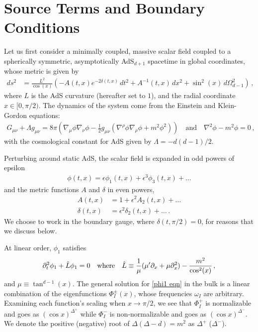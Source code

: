 \documentclass[../PhD.tex]{subfiles}
\begin{document}

\section{Source Terms and Boundary Conditions}
\label{sec: source terms and BCs}

Let us first consider a minimally coupled, massive scalar field coupled to a spherically symmetric, asymptotically AdS$_{d+1}$ spacetime in global coordinates, whose metric is given by
\begin{align}
\label{AdS metric}
ds^2 &= \frac{L^2}{\cos(x)} \left( - A(t,x) e^{-2 \delta(t,x)} \, dt^2 + A^{-1}(t, x) \, dx^2 + \sin^2 (x) \, d\Omega^2_{d-1} \right) \, ,
\end{align}
where $L$ is the AdS curvature (hereafter set to $1$), and the radial coordinate $x \in [0, \pi/2)$. The dynamics of the system come from the Einstein and Klein-Gordon equations:
\begin{align}
G_{\mu \nu} + \Lambda g_{\mu \nu} = 8 \pi \left( \nabla_\mu \phi \nabla_\nu \phi - \frac{1}{2} g_{\mu \nu} \left( \nabla^\rho \phi \nabla_\rho \phi + m^2 \phi^2 \right) \right) \quad \text{and} \quad \nabla^2 \phi - m^2 \phi = 0 \, ,
\end{align}
with the cosmological constant for AdS given by $\Lambda = -d(d-1)/2$. 

Perturbing around static AdS, the scalar field is expanded in odd powers of epsilon 
\begin{align}
\phi(t,x) = \epsilon \phi_1(t,x) + \epsilon^3 \phi_3 (t,x) + \ldots
\end{align}
and the metric functions $A$ and $\delta$ in even powers,
\begin{align}
A(t, x) &= 1 + \epsilon^2 A_2 (t,x) + \ldots \\
\delta(t, x) &= \epsilon^2 \delta_2 (t,x)+ \ldots \, .
\end{align}
We choose to work in the boundary gauge, where $\delta(t, \pi/2) = 0$, for reasons that we discuss below.

At linear order, $\phi_1$ satisfies
\begin{align}
\label{phi1 eqn}
\partial^2_t \phi_1 + \hat L \phi_1 = 0 \quad \text{where} \quad \hat{L} \equiv \frac{1}{\mu} (\mu' \partial_x + \mu \partial^2_x)  - \frac{m^2}{\cos^2(x)} \, ,
\end{align}
and $\mu \equiv \tan^{d-1}(x)$. The general solution for \eqref{phi1 eqn} in the bulk is a linear combination of the eigenfunctions $\Phi^\pm_I (x)$, whose frequencies $\omega_I$ are arbitrary. Examining each function's scaling when $x \to \pi/2$,  we see that $\Phi_I^+$ is normalizable and goes as $(\cos x )^{\Delta^+}$\!\! while $\Phi_I^-$ is non-normalizable and goes as $( \cos x )^{\Delta^-}$. We denote the positive (negative) root of $\Delta ( \Delta - d ) = m^2$ as $\Delta^+$\!\! ($\Delta^-$). 
\end{document}
